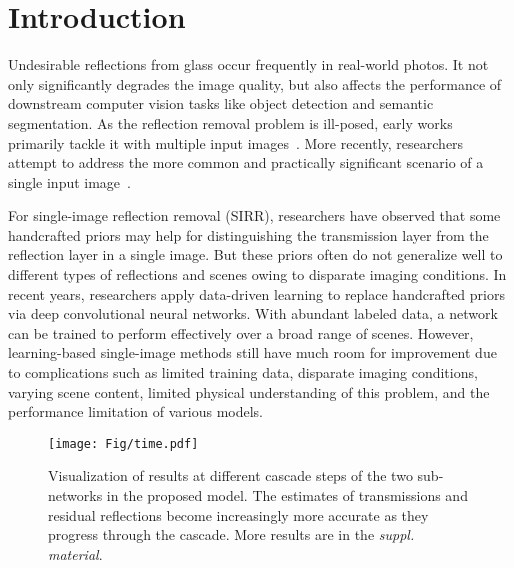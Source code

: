 \documentclass[10pt,twocolumn,letterpaper]{article}
\begin{document}
\section{Introduction}
Undesirable reflections from glass occur frequently in real-world photos. It not only significantly degrades the image quality, but also affects the performance of downstream computer vision tasks like object detection and semantic segmentation. As the reflection removal problem is ill-posed, early works primarily tackle it with multiple input images~\cite{szeliski2000layer, sarel2004separating, li2013exploiting, xue2015computational, guo2014robust,  sun2016automatic,  gai2011blind, han2017reflection}. More recently, researchers attempt to address the more common and practically significant scenario of a single input image~\cite{levin2003learning, levin2004separating, li2013exploiting, li2014single, wan2016depth, springer2017reflection, arvanitopoulos2017single, tuncer2011ground}. 


For single-image reflection removal (SIRR), researchers have observed that some handcrafted priors may help for distinguishing the transmission layer from the reflection layer in a single image. But these priors often do not generalize well to different types of reflections and scenes owing to disparate imaging conditions. In recent years, researchers apply data-driven learning to replace handcrafted priors via deep convolutional neural networks. With abundant labeled data, a network can be trained to perform effectively over a broad range of scenes. However, learning-based single-image methods still have much room for improvement due to complications such as limited training data, disparate imaging conditions, varying scene content, limited physical understanding of this problem, and the performance limitation of various models. 

\begin{figure*}[htbp]
    \centering
    \texttt{[image: Fig/time.pdf]}
    \caption{Visualization of results at different cascade steps of the two sub-networks in the proposed model. The estimates of transmissions and residual reflections become increasingly more accurate as they progress through the cascade. More results are in the \textit{suppl. material}.
    }
    \vspace{-0.2em}
    \label{fig:cascading-results}
\end{figure*}
\end{document}
